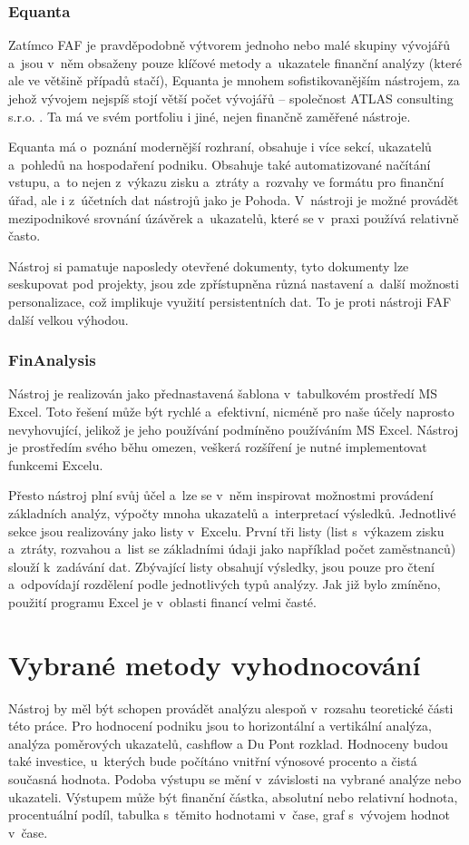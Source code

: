 \subsubsection{Equanta}
Zatímco FAF je pravděpodobně výtvorem jednoho nebo malé skupiny vývojářů a~jsou v~něm obsaženy pouze klíčové metody a~ukazatele finanční analýzy (které ale ve většině případů stačí), Equanta je mnohem sofistikovanějším nástrojem, za jehož vývojem nejspíš stojí větší počet vývojářů -- společnost ATLAS consulting s.r.o. . Ta má ve svém portfoliu i jiné, nejen finančně zaměřené nástroje.

Equanta má o~poznání modernější rozhraní, obsahuje i více sekcí, ukazatelů a~pohledů na hospodaření podniku. Obsahuje také automatizované načítání vstupu, a~to nejen z~výkazu zisku a~ztráty a~rozvahy ve formátu pro finanční úřad, ale i z~účetních dat nástrojů jako je Pohoda. V~nástroji je možné provádět mezipodnikové srovnání úzávěrek a~ukazatelů, které se v~praxi používá relativně často.

Nástroj si pamatuje naposledy otevřené dokumenty, tyto dokumenty lze seskupovat pod projekty, jsou zde zpřístupněna různá nastavení a~další možnosti personalizace, což implikuje využití persistentních dat. To je proti nástroji FAF další velkou výhodou. 


\subsubsection{FinAnalysis}
Nástroj je realizován jako přednastavená šablona v~tabulkovém prostředí MS Excel. Toto řešení může být rychlé a~efektivní, nicméně pro naše účely naprosto nevyhovující, jelikož je jeho používání podmíněno používáním MS Excel. Nástroj je prostředím svého běhu omezen, veškerá rozšíření je nutné implementovat funkcemi Excelu.

Přesto nástroj plní svůj ůčel a~lze se v~něm inspirovat možnostmi provádení základních analýz, výpočty mnoha ukazatelů a~interpretací výsledků. Jednotlivé sekce jsou realizovány jako listy v~Excelu. První tři listy (list s~výkazem zisku a~ztráty, rozvahou a~list se základními údaji jako například počet zaměstnanců) slouží k~zadávání dat. Zbývající listy obsahují výsledky, jsou pouze pro čtení a~odpovídají rozdělení podle jednotlivých typů analýzy. Jak již bylo zmíněno, použití programu Excel je v~oblasti financí velmi časté.



\section{Vybrané metody vyhodnocování}
Nástroj by měl být schopen provádět analýzu alespoň v~rozsahu teoretické části této práce. Pro hodnocení podniku jsou to horizontální a vertikální analýza, analýza poměrových ukazatelů, cashflow a Du Pont rozklad. Hodnoceny budou také investice, u~kterých bude počítáno vnitřní výnosové procento a čistá současná hodnota. Podoba výstupu se mění v~závislosti na vybrané analýze nebo ukazateli. Výstupem může být finanční částka, absolutní nebo relativní hodnota, procentuální podíl, tabulka s~těmito hodnotami v~čase, graf s~vývojem hodnot v~čase.


